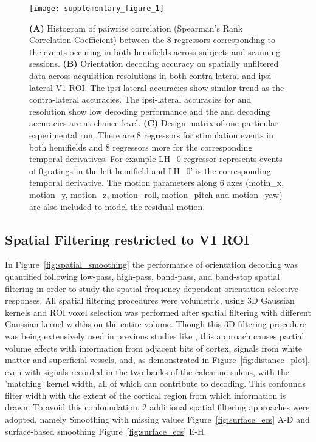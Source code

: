 \begin{figure} \centering
  \texttt{[image: supplementary\_figure\_1]}
  \caption{     \textbf{(A)} Histogram of paiwrise correlation (Spearman's Rank Correlation 
    Coefficient) between the 8 regressors corresponding to the events 
    occuring in both hemifields across subjects and scanning sessions. 
    \textbf{(B)} Orientation decoding accuracy on spatially unfiltered data 
    across acquisition resolutions in both contra-lateral and ipsi-lateral 
    V1 ROI. The ipsi-lateral accuracies show similar trend as the contra-lateral
    accuracies. The ipsi-lateral accuracies for  and  resolution show 
    low decoding performance and the  and  decoding accuracies 
    are at chance level. \textbf{(C)} Design matrix of one particular experimental run.
    There are 8 regressors for stimulation events in both hemifields 
    and 8 regressors more for the corresponding temporal derivatives. For 
    example LH\_0 regressor represents events of 0\textdegree gratings in 
    the left hemifield and LH\_0' is the corresponding temporal derivative.
    The motion parameters along 6 axes (motin\_x, motion\_y, motion\_z, 
    motion\_roll, motion\_pitch and motion\_yaw) are also included to model 
    the residual motion. 
  }

    \label{fig:ipsi}
\end{figure}


\subsection*{Spatial Filtering restricted to V1 ROI}


In Figure~\ref{fig:spatial_smoothing} the performance of orientation decoding was quantified following 
low-pass, high-pass, band-pass, and  band-stop spatial filtering in order to study 
the spatial frequency dependent orientation selective responses. All spatial filtering 
procedures were volumetric, using 3D Gaussian kernels and  ROI voxel 
selection was performed after spatial filtering with different Gaussian kernel widths 
on the entire volume. Though this 3D filtering procedure was 
being extensively used in previous studies like \citep{opdebeeck_2010, swisher_2010}, 
this approach causes partial volume effects with information from adjacent bits of 
cortex, signals from white matter and superficial vessels, and, as demonstrated 
in Figure~\ref{fig:distance_plot}, even with signals recorded in the two banks of  
the calcarine sulcus, with the 'matching' kernel width, all of which 
can contribute to decoding. This confounds filter width with the 
extent of the cortical region from which information is drawn. To avoid 
this confoundation, 2 additional spatial filtering approaches were adopted, namely
Smoothing with missing values Figure~\ref{fig:surface_ecs} A-D and surface-based 
smoothing Figure~\ref{fig:surface_ecs} E-H.
  
